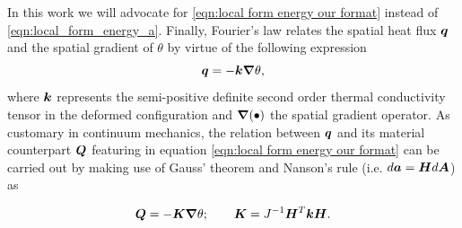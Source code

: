 In this work we will advocate for \eqref{eqn:local form energy our format} instead of \eqref{eqn:local_form_energy_a}.  Finally, Fourier's law relates the spatial heat flux $\boldsymbol{q}$ and the spatial gradient of $\theta$ by virtue of the following expression
%
\begin{equation}
  \label{eqn:Duhamel}
  \boldsymbol{q} = -\boldsymbol{k}\boldsymbol{\nabla}\theta,
\end{equation}
%
where $\boldsymbol{k}$ represents the semi-positive definite second order thermal conductivity tensor in the deformed configuration and $\boldsymbol{\nabla}(\bullet)$ the spatial gradient operator. 
As customary in continuum mechanics, the relation between $\boldsymbol{q}$ and its material counterpart $\boldsymbol{Q}$ featuring in equation \eqref{eqn:local form energy our format} can be carried out by making use of  Gauss' theorem and  Nanson's rule (i.e. $d\boldsymbol{a}=\boldsymbol{H}d\boldsymbol{A}$) as
\addtocounter{equation}{3}  %
%
\begin{equation}
  \boldsymbol{Q} = -\boldsymbol{K}\boldsymbol{\nabla}\theta;\qquad
  \boldsymbol{K} = J^{-1}\boldsymbol{H}^T\boldsymbol{k}\boldsymbol{H}.
\end{equation}






